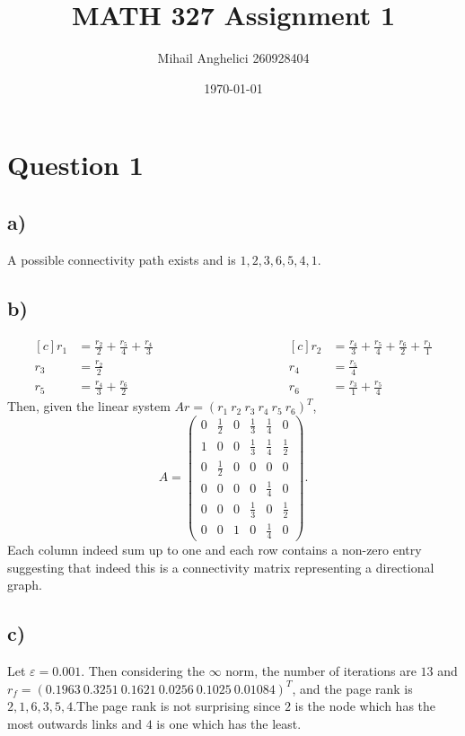 \documentclass[12pt]{article}
\title{MATH 327 Assignment 1}
\author{Mihail Anghelici 260928404 }
\date{\today}
\theoremstyle{definition}
\theoremstyle{definition}
\theoremstyle{definition}
\theoremstyle{definition}
\theoremstyle{definition}
\theoremstyle{example}
\theoremstyle{note}
\theoremstyle{remark}
\theoremstyle{example}
\begin{document}
	\maketitle
	\section*{Question 1}
	\subsection*{a) }
		A possible connectivity path exists and is $1,2,3,6,5,4,1$.
	\subsection*{b) }	
		\begin{equation*}
			\begin{aligned}[c]
				r_{1} &= \frac{r_{2}}{2} + \frac{r_{5}}{4} + \frac{r_{4}}{3}\\
				r_{3} &= \frac{r_{2}}{2} \\
				r_{5} &= \frac{r_{4}}{3} + \frac{r_{6}}{2} 
			\end{aligned}
			\qquad \qquad\qquad\qquad\qquad
			\begin{aligned}[c]
			r_{2} &= \frac{r_{4}}{3} + \frac{r_{5}}{4} + \frac{r_{6}}{2} + \frac{r_{1}}{1}\\
			r_{4} &= \frac{r_{5}}{4} \\
			r_{6} &= \frac{r_{3}}{1} + \frac{r_{5}}{4} 
			\end{aligned}
		\end{equation*}
		Then, given the linear system $Ar = (r_{1} \ r_{2} \ r_{3} \ r_{4} \ r_{5} \ r_{6} )^{T}$, 
		\begin{equation}
			A = \begin{pmatrix}
				0 & \frac12 &0 &\frac13 &\frac14 &0 \\ 
				1& 0& 0& \frac13& \frac14 &\frac12 \\
				0 &\frac12& 0 &0 & 0& 0  \\
				0 &0 &0 &0& \frac14& 0 \\
				0 &0 &0 &\frac13 &0 &\frac12 \\
				0 &0& 1& 0& \frac14 &0
			\end{pmatrix}.
		\end{equation}
		Each column indeed sum up to one and each row contains a non-zero entry suggesting that indeed this is a connectivity matrix representing a directional graph.
		\subsection*{c) }
			Let $\varepsilon = 0.001$. Then considering the $\infty$ norm, the number of iterations are $13$ and 
			$r_{f} = (0.1963 \ 0.3251 \ 0.1621 \ 0.0256 \ 0.1025 \ 0.01084)^{T}$, and the page rank is $2,1,6,3,5,4$.The page rank is not surprising since $2$ is the node which has the most outwards links and $4$ is one which has the least. 
\end{document}
